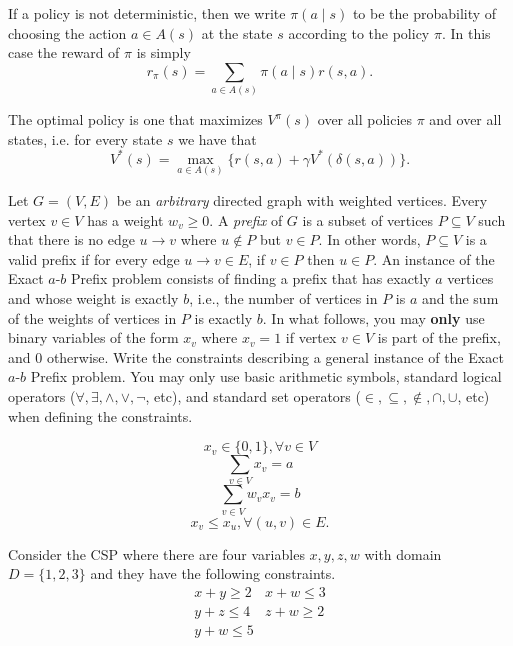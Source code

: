 \documentclass[10pt,a4paper,answers]{exam}
\begin{document}
{If a policy is not deterministic, then we write $\pi(a\mid s)$ to be the probability of choosing the action $a\in A(s)$ at the state $s$ according to the policy $\pi$. In this case the reward of $\pi$ is simply 
$$r_{\pi}(s) = \sum_{a \in A(s)}\pi(a\mid s)r(s,a).$$

The optimal policy is one that maximizes $V^\pi(s)$ over all policies $\pi$ and over all states, i.e. for every state $s$ we have that 
$$V^*(s) = \max_{a \in A(s)} \{r(s,a) + \gamma V^*(\delta(s,a))\}.$$
\begin{questions}
\question[15] Let $G=(V,E)$ be an \textit{arbitrary} directed graph with weighted vertices. Every vertex $v \in V$ has a weight $w_v \ge 0$. 
A \emph{prefix} of $G$ is a subset of vertices $P\subseteq V$ such that there is no edge $u\to v$ where $u\notin P$ but $v\in P$. In other words, $P\subseteq V$ is a valid prefix if for every edge $u\to v \in E$, if $v \in P$ then $u \in P$. 
An instance of the Exact $a$-$b$ Prefix problem consists of finding a prefix that has exactly $a$ vertices and whose weight is exactly $b$, i.e., the number of vertices in $P$ is $a$ and the sum of the weights of vertices in $P$ is exactly $b$. 
In what follows, you may \textbf{only} use binary variables of the form $x_v$ where $x_v=1$ if vertex $v\in V$ is part of the prefix, and 0 otherwise. 
Write the constraints describing a general instance of the Exact $a$-$b$ Prefix problem. You may only use basic arithmetic symbols, standard logical operators ($\forall, \exists,\wedge, \lor,\neg$, etc), and standard set operators ($\in, \subseteq, \notin, \cap, \cup$, etc) when defining the constraints. %
\begin{solution}
\[x_v \in \{0,1\}, \forall v \in V\]
\[\sum_{v \in V} x_v = a\]
\[\sum_{v \in V} w_v x_v = b\]
\[x_v \le x_u, \forall (u,v) \in E.\]
\end{solution}


\question[15] Consider the CSP where there are four variables $x,y,z,w$ with domain $D=\{1,2,3\}$ and they have the following constraints. 
\begin{align*}
  &  x+y\geq 2 &  x+w\leq 3 &\\
  & y+z\leq 4 &  z+w\geq 2 & \\
  & y+w\leq 5 & &\\
\end{align*}

\begin{parts}

\end{parts}
\end{questions}}
\end{document}
